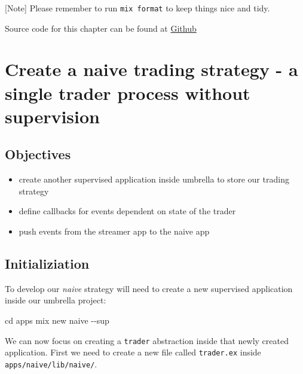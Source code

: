 \documentclass[
  oneside]{book}
\newenvironment{Shaded}{\begin{snugshade}}{\end{snugshade}}
\newcommand{\AttributeTok}[1]{\textcolor[rgb]{0.77,0.63,0.00}{#1}}
\newcommand{\BuiltInTok}[1]{#1}
\newcommand{\ExtensionTok}[1]{#1}
\newcommand{\NormalTok}[1]{#1}
\providecommand{\tightlist}{%
  \setlength{\itemsep}{0pt}\setlength{\parskip}{0pt}}
\begin{document}
{[}Note{]} Please remember to run \texttt{mix\ format} to keep things nice and tidy.

Source code for this chapter can be found at \href{https://github.com/frathon/create-a-cryptocurrency-trading-bot-in-elixir-source-code/tree/chapter_01}{Github}

\hypertarget{create-a-naive-trading-strategy---a-single-trader-process-without-supervision}{%
\chapter{Create a naive trading strategy - a single trader process without supervision}\label{create-a-naive-trading-strategy---a-single-trader-process-without-supervision}}

\hypertarget{objectives-1}{%
\section{Objectives}\label{objectives-1}}

\begin{itemize}
\tightlist
\item
  create another supervised application inside umbrella to store our trading strategy
\item
  define callbacks for events dependent on state of the trader
\item
  push events from the streamer app to the naive app
\end{itemize}

\hypertarget{initializiation}{%
\section{Initializiation}\label{initializiation}}

To develop our \emph{naive} strategy will need to create a new supervised application inside our umbrella project:

\begin{Shaded}
\begin{Highlighting}[]
\BuiltInTok{cd}\NormalTok{ apps}
\ExtensionTok{mix}\NormalTok{ new naive }\AttributeTok{{-}{-}sup}
\end{Highlighting}
\end{Shaded}

We can now focus on creating a \texttt{trader} abstraction inside that newly created application. First we need to create a new file called \texttt{trader.ex} inside \texttt{apps/naive/lib/naive/}.
\end{document}
